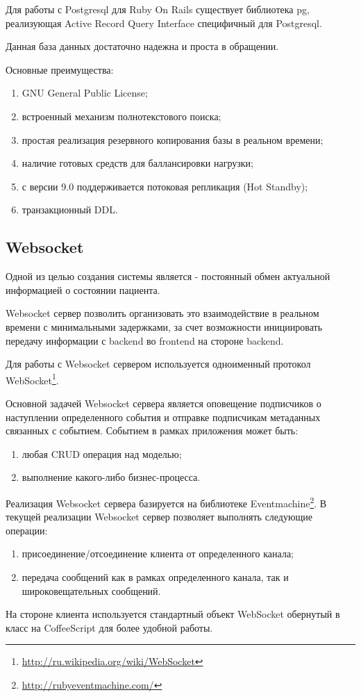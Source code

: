 Для работы с Postgresql для Ruby On Rails существует библиотека pg, реализующая
Active Record Query Interface специфичный для Postgresql.

Данная база данных достаточно надежна и проста в обращении.

Основные преимущества:
\begin{enumerate}
  \item GNU General Public License;
  \item встроенный механизм полнотекстового поиска;
  \item простая реализация резервного копирования базы в реальном времени;
  \item наличие готовых средств для баллансировки нагрузки;
  \item с версии 9.0 поддерживается потоковая репликация (Hot Standby);
  \item транзакционный DDL.
\end{enumerate}

\subsection{Websocket}
Одной из целью создания системы является - постоянный обмен актуальной
информацией о состоянии пациента.
	
Websocket сервер позволить организовать это взаимодействие в реальном времени с
минимальными задержками, за счет возможности инициировать передачу информации с
backend во frontend на стороне backend.
	
Для работы с Websocket сервером используется одноименный протокол WebSocket\footnote{
	\url{http://ru.wikipedia.org/wiki/WebSocket}
}.

Основной задачей Websocket сервера является оповещение подписчиков о наступлении
определенного события и отправке подписчикам метаданных связанных с событием.
Событием в рамках приложения может быть:
\begin{enumerate}
  \item любая CRUD операция над моделью;
  \item выполнение какого-либо бизнес-процесса.
\end{enumerate}

Реализация Websocket сервера базируется на библиотеке Eventmachine\footnote{
	\url{http://rubyeventmachine.com/}
}. В текущей реализации Websocket сервер позволяет выполнять следующие операции:
\begin{enumerate}
  \item присоединение/отсоединение клиента от определенного канала;
  \item передача сообщений как в рамках определенного канала, так и
широковещательных сообщений.
\end{enumerate}

На стороне клиента используется стандартный объект WebSocket обернутый в класс
на CoffeeScript для более удобной работы.
